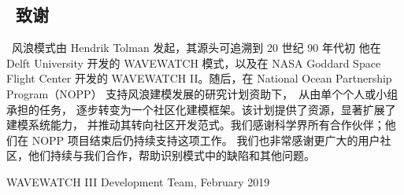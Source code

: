 \vssub
\subsection{~致谢}
\vssub

\ws\ 风浪模式由 Hendrik Tolman 发起，其源头可追溯到 20 世纪 90 年代初
他在 Delft University 开发的 WAVEWATCH 模式，以及在 NASA Goddard Space Flight Center
开发的 WAVEWATCH II。随后，在 National Ocean Partnership Program（NOPP）
支持风浪建模发展的研究计划资助下，\ws\ 从由单个个人或小组承担的任务，
逐步转变为一个社区化建模框架。该计划提供了资源，显著扩展了建模系统能力，
并推动其转向社区开发范式。我们感谢科学界所有合作伙伴；他们在 NOPP 项目结束后仍持续支持这项工作。
我们也非常感谢更广大的用户社区，他们持续与我们合作，帮助识别模式中的缺陷和其他问题。
\vspace{\baselineskip}
\vspace{\baselineskip}
\strut \hfill WAVEWATCH III Development Team, February 2019
